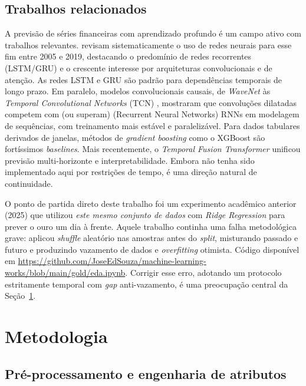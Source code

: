 \documentclass[12pt]{article}
\begin{document}
\subsection{Trabalhos relacionados}
\label{sec:relacionados}

A previsão de séries financeiras com aprendizado profundo é um campo ativo com trabalhos relevantes.
\cite{sezer2020dlreview} revisam sistematicamente o uso de redes neurais para
esse fim entre 2005 e 2019, destacando o predomínio de redes recorrentes
(LSTM/GRU) e o crescente interesse por arquiteturas convolucionais e de atenção.
As redes LSTM \cite{hochreiter1997lstm} e GRU \cite{cho2014gru} são padrão para
dependências temporais de longo prazo. Em paralelo, modelos convolucionais
causais, de \emph{WaveNet} \cite{oord2016wavenet} às \emph{Temporal
Convolutional Networks} (TCN) \cite{bai2018tcn}, mostraram que convoluções
dilatadas competem com (ou superam) (Recurrent Neural Networks) RNNs em modelagem de sequências, com
treinamento mais estável e paralelizável. Para dados tabulares derivados de
janelas, métodos de \emph{gradient boosting} como o XGBoost
\cite{chen2016xgboost} são fortíssimos \emph{baselines}. Mais recentemente, o
\emph{Temporal Fusion Transformer} \cite{lim2021tft} unificou previsão
multi-horizonte e interpretabilidade. Embora não tenha sido implementado aqui
por restrições de tempo, é uma direção natural de continuidade.

O ponto de partida direto deste trabalho foi um experimento acadêmico anterior
(2025) que utilizou \emph{este mesmo conjunto de dados} com \emph{Ridge
Regression} para prever o ouro um dia à frente. Aquele trabalho continha uma
falha metodológica grave: aplicou \emph{shuffle} aleatório nas amostras antes do
\emph{split}, misturando passado e futuro e produzindo vazamento de dados e
\emph{overfitting} otimista. Código disponível em
\url{https://github.com/JoseEdSouza/machine-learning-works/blob/main/gold/eda.ipynb}.
Corrigir esse erro, adotando um protocolo estritamente temporal com
\emph{gap} anti-vazamento, é uma preocupação central da
Seção~\ref{sec:metodologia}.

\section{Metodologia}
\label{sec:metodologia}

\subsection{Pré-processamento e engenharia de atributos}
\label{sec:preproc}
\end{document}
